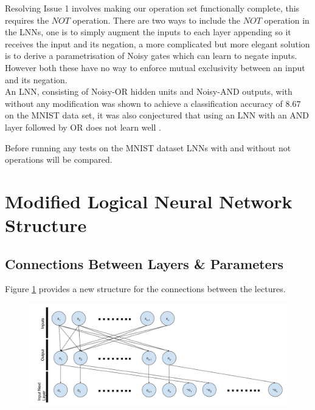 Resolving Issue 1 involves making our operation set functionally complete, this requires the $NOT$ operation. There are two ways to include the $NOT$ operation in the LNNs, one is to simply augment the inputs to each layer appending so it receives the input and its negation, a more complicated but more elegant solution is to derive a parametrisation of Noisy gates which can learn to negate inputs. However both these have no way to enforce mutual exclusivity between an input and its negation.\\

An LNN, consisting of Noisy-OR hidden units and Noisy-AND outputs, with without any modification was shown to achieve a classification accuracy of $8.67$ on the MNIST data set, it was also conjectured that using an LNN with an AND layer followed by OR does not learn well \cite{LearningLogicalActivations}. 


Before running any tests on the MNIST dataset LNNs with and without not operations will be compared.

\section{Modified Logical Neural Network Structure} \label{sec:modified-lnn-structure}
\subsection{Connections Between Layers \& Parameters}
Figure \ref{fig:modified-lnn-structure} provides a new structure for the connections between the lectures.

\begin{figure}[H]
	\centering
	\begin{minipage}[b]{0.9\textwidth}
		\includegraphics[width=\textwidth]{Modified-LNN-Structure.png}
		\caption{}
		\label{fig:modified-lnn-structure}
	\end{minipage}
	\hfill
\end{figure}


